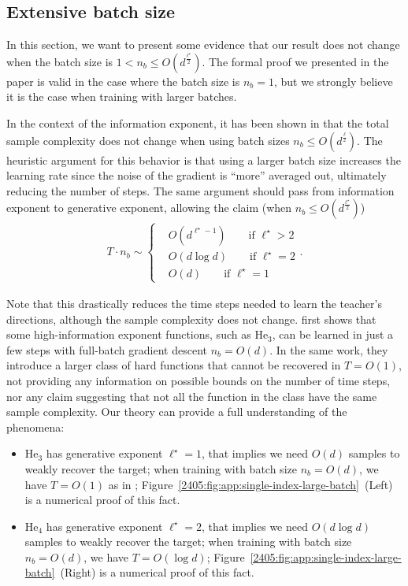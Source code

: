 \subsection{Extensive batch size}
In this section, we want to present some evidence that our result does not change when the batch size is $1 < n_b \le O(d^{\frac{\ell^\star}{2}})$. The formal proof we presented in the paper is valid in the case where the batch size is \(n_b=1\), but we strongly believe it is the case when training with larger batches.

In the context of the information exponent, it has been shown in \cite{arnaboldi2024online} that the total sample complexity does not change when using batch sizes \(n_b \le O\left(d^{\frac{\ell}{2}}\right)\). The heuristic argument for this behavior is that using a larger batch size increases the learning rate since the noise of the gradient is ``more'' averaged out, ultimately reducing the number of steps.
The same argument should pass from information exponent to generative exponent, allowing the claim (when \(n_b \le O\left(d^{\frac{\ell^\star}{2}}\right)\)) 
\begin{align}
    T \cdot n_b \sim 
        \begin{cases}
        &O(d^{\ell^\star -1} ) \qquad \text{if $\ell^\star>2$} \\
        &O(d \log{d} ) \qquad \text{if $\ell^\star=2$} \\
        &O(d) \qquad \text{if $\ell^\star=1$}
    \end{cases}.
\end{align}

Note that this drastically reduces the time steps needed to learn the teacher's directions, although the sample complexity does not change. \cite{dandi2024benefits} first shows that some high-information exponent functions, such as \(\mathrm{He}_3\), can be learned in just a few steps with full-batch gradient descent \(n_b = O(d)\). In the same work, they introduce a larger class of hard functions that cannot be recovered in \(T=O(1)\), not providing any information on possible bounds on the number of time steps, nor any claim suggesting that not all the function in the class have the same sample complexity. Our theory can provide a full understanding of the phenomena:
\begin{itemize}
    \item \(\mathrm{He}_3\) has generative exponent \(\ell^\star=1\), that implies we need \(O(d)\) samples to weakly recover the target; when training with batch size \(n_b=O(d)\), we have \(T=O(1)\) as in \cite{dandi2024benefits}; Figure~\ref{2405:fig:app:single-index-large-batch}~(Left) is a numerical proof of this fact.
    \item \(\mathrm{He}_4\) has generative exponent \(\ell^\star=2\), that implies we need \(O(d\log d)\) samples to weakly recover the target; when training with batch size \(n_b=O(d)\), we have \(T=O(\log d)\); Figure~\ref{2405:fig:app:single-index-large-batch}~(Right) is a numerical proof of this fact.
\end{itemize}

